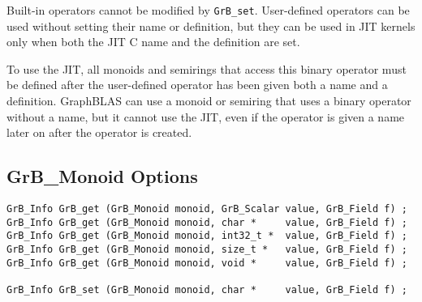 Built-in operators cannot be modified by \verb'GrB_set'.  User-defined
operators can be used without setting their name or definition, but they can be
used in JIT kernels only when both the JIT C name and the definition are set.

To use the JIT, all monoids and semirings that access this binary operator must
be defined after the user-defined operator has been given both a name and a
definition.  GraphBLAS can use a monoid or semiring that uses a binary operator
without a name, but it cannot use the JIT, even if the operator is given a name
later on after the operator is created.

\newpage
\subsection{{\sf GrB\_Monoid} Options}
\label{get_set_monoid}

\begin{mdframed}[userdefinedwidth=6in]
{\footnotesize
\begin{verbatim}
GrB_Info GrB_get (GrB_Monoid monoid, GrB_Scalar value, GrB_Field f) ;
GrB_Info GrB_get (GrB_Monoid monoid, char *     value, GrB_Field f) ;
GrB_Info GrB_get (GrB_Monoid monoid, int32_t *  value, GrB_Field f) ;
GrB_Info GrB_get (GrB_Monoid monoid, size_t *   value, GrB_Field f) ;
GrB_Info GrB_get (GrB_Monoid monoid, void *     value, GrB_Field f) ;

GrB_Info GrB_set (GrB_Monoid monoid, char *     value, GrB_Field f) ;
\end{verbatim}
}\end{mdframed}


